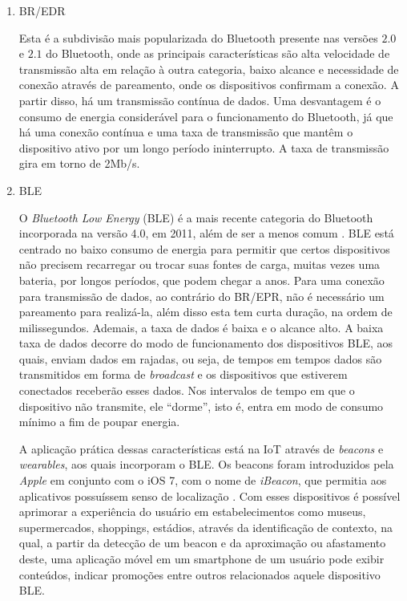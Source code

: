 \begin{enumerate}[label=(\Alph*)]
    
    \item {BR/EDR}
    
    Esta é a subdivisão mais popularizada do Bluetooth presente nas versões $2.0$ e $2.1$ do Bluetooth, onde as principais características são alta velocidade de transmissão alta em relação à outra categoria, baixo alcance e necessidade de conexão através de pareamento, onde os dispositivos confirmam a conexão. A partir disso, há um transmissão contínua de dados. Uma desvantagem é o consumo de energia considerável para o funcionamento do Bluetooth, já que há 
    uma conexão contínua e uma taxa de transmissão que mantêm o dispositivo ativo por um longo período ininterrupto.
    A taxa de transmissão gira em torno de 2Mb/s.
     
    
    \item BLE
    
    
    O \textit{Bluetooth Low Energy} (BLE) é a mais recente categoria do Bluetooth incorporada na versão 4.0, em 2011, além de ser a menos comum \cite{LinkLabs2015}.
    BLE está centrado no baixo consumo de energia para permitir que certos dispositivos não precisem recarregar ou trocar suas fontes de carga, muitas vezes uma bateria, por longos períodos, que podem chegar a anos. 
    Para uma conexão para transmissão de dados, ao contrário do BR/EPR, não é necessário um pareamento para realizá-la, além disso esta tem curta duração, na ordem de milissegundos.
    Ademais, a taxa de dados é baixa e o alcance alto. A baixa taxa de dados decorre do modo de funcionamento dos dispositivos BLE, aos quais, enviam dados em rajadas, ou seja, de tempos em tempos dados são transmitidos em forma de \textit{broadcast} e os dispositivos que estiverem conectados receberão esses dados. Nos intervalos de tempo em que o dispositivo não transmite, ele ``dorme'', isto é, entra em modo de consumo mínimo a fim de poupar energia.
    
    A aplicação prática dessas características está na IoT através de \textit{beacons} e \textit{wearables}, aos quais incorporam o BLE. Os beacons foram introduzidos pela \textit{Apple} em conjunto com o iOS 7, com o nome de \textit{iBeacon}, que permitia aos aplicativos possuíssem senso de localização \cite{Apple2014}. Com esses dispositivos é possível aprimorar a experiência do usuário em estabelecimentos como museus, supermercados, shoppings, estádios, através da identificação de contexto, na qual, a partir da detecção de um beacon e da aproximação ou afastamento deste, uma aplicação móvel em um smartphone de um usuário pode exibir conteúdos, indicar promoções entre outros relacionados aquele dispositivo BLE.
    

\end{enumerate}
